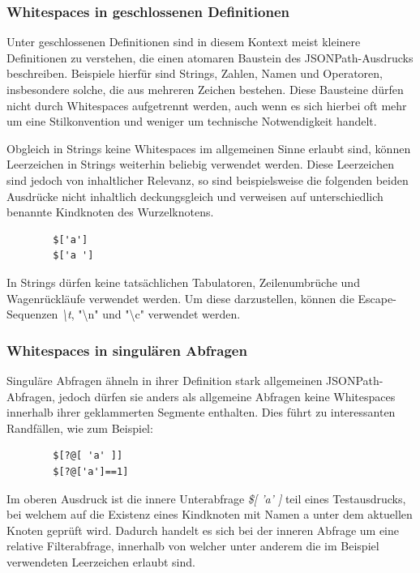 \documentclass[oneside]{ausarbeitung}
\begin{document}
	
	
	\subsubsection{Whitespaces in geschlossenen Definitionen}
	
	Unter geschlossenen Definitionen sind in diesem Kontext meist kleinere Definitionen zu verstehen, die einen atomaren Baustein des JSONPath-Ausdrucks beschreiben. Beispiele hierfür sind Strings, Zahlen, Namen und Operatoren, insbesondere solche, die aus mehreren Zeichen bestehen. Diese Bausteine dürfen nicht durch Whitespaces aufgetrennt werden, auch wenn es sich hierbei oft mehr um eine Stilkonvention und weniger um technische Notwendigkeit handelt.
	
	Obgleich in Strings keine Whitespaces im allgemeinen Sinne erlaubt sind, können Leerzeichen in Strings weiterhin beliebig verwendet werden. Diese Leerzeichen sind jedoch von inhaltlicher Relevanz, so sind beispielsweise die folgenden beiden Ausdrücke nicht inhaltlich deckungsgleich und verweisen auf unterschiedlich benannte Kindknoten des Wurzelknotens.
	
	\begin{lstlisting}
		$['a']
		$['a ']
	\end{lstlisting}
	
	In Strings dürfen keine tatsächlichen Tabulatoren, Zeilenumbrüche und Wagenrückläufe verwendet werden. Um diese darzustellen, können die Escape-Sequenzen \textit{\textbackslash t}, "\textbackslash{}n" und "\textbackslash{}c" verwendet werden.
	
	
	
	\subsubsection{Whitespaces in singulären Abfragen}
	
	
	Singuläre Abfragen ähneln in ihrer Definition stark allgemeinen JSONPath-Abfragen, jedoch dürfen sie anders als allgemeine Abfragen keine Whitespaces innerhalb ihrer geklammerten Segmente enthalten.
	Dies führt zu interessanten Randfällen, wie zum Beispiel:
	
	\begin{lstlisting}
		$[?@[ 'a' ]]
		$[?@['a']==1]
	\end{lstlisting}
	
	Im oberen Ausdruck ist die innere Unterabfrage \textit{\$[ 'a' ]} teil eines Testausdrucks, bei welchem auf die Existenz eines Kindknoten mit Namen a unter dem aktuellen Knoten geprüft wird. Dadurch handelt es sich bei der inneren Abfrage um eine relative Filterabfrage, innerhalb von welcher unter anderem die im Beispiel verwendeten Leerzeichen erlaubt sind. 
	
\end{document}

